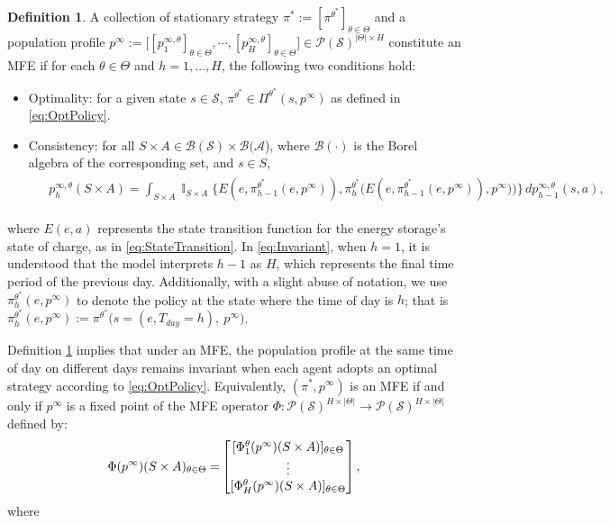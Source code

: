 \documentclass{article}
\theoremstyle{definition}
\newtheorem{definition}{Definition}
\theoremstyle{plain}
\DeclareMathOperator{\I}{\mathbb{I}}
\begin{document}
\begin{definition}
	\label{def:MFE}
	A collection of stationary strategy $\pi^{*} := [\pi^{\theta^{*}}]_{\theta \in \Theta}$ and a population profile $p^{\infty}:=\big[[p^{\infty,\theta}_1]_{\theta \in \Theta},\cdots,[p^{\infty,\theta}_{H}]_{\theta \in \Theta}\big] \in \mathcal{P}(\mathcal{S})^{|\Theta|\times H}$ constitute an MFE if for each $\theta \in \Theta$ and $h = 1, \ldots, H$,  the following two conditions hold: 
	\begin{itemize}
      \setlength{\itemindent}{0.5em}
		\item Optimality: for a given state $s \in \mathcal{S}$, $\pi^{\theta^{*}} \in \Pi^{\theta^*}(s, p^{\infty})$ as defined in \eqref{eq:OptPolicy}.
		
		\item Consistency: for all $S \times A \in \mathcal{B}(\mathcal{S}) \times \mathcal{B}(\mathcal{A}$), where $\mathcal{B}(\cdot)$ is the Borel algebra of the corresponding set, and $s \in S$, 
		\begin{align}
		\begin{split}
		&p^{\infty,\theta}_h(S \times A) = \int_{S \times A} \I_{S \times A}\bigg\{E\left(e,\pi^{\theta^*}_{h-1}\left(e, p^{\infty}\right) \right), \pi_h^{\theta^*}\Big( E\left(e,\pi^{\theta^*}_{h-1}(e,p^{\infty})\right), p^{\infty})\Big)\bigg\} \, dp^{\infty,\theta}_{h-1}(s,a), \label{eq:Invariant}
		\end{split}
		\end{align}
	\end{itemize}
\end{definition} 
\noindent where $E(e, a)$ represents the state transition function for the energy storage's state of charge,  as in \eqref{eq:StateTransition}. 
In \eqref{eq:Invariant}, when \( h = 1 \), it is understood that the model interprets \( h-1 \) as \( H \), which represents the final time period of the previous day. Additionally, with a slight abuse of notation, we use \( \pi^{\theta^*}_{h}(e, p^{\infty}) \) to denote the policy at the state where the time of day is \( h \); that is \(\pi^{\theta^*}_{h}(e, p^{\infty}) := \pi^{\theta^*}\big(s = (e, T_{day} = h),\ p^{\infty}\big) \).

Definition \ref{def:MFE} implies that under an MFE, the population profile at the same time of day on different days remains invariant when each agent adopts an optimal strategy according to \eqref{eq:OptPolicy}. Equivalently, $(\pi^*,p^{\infty})$ is an MFE if and only if $p^{\infty}$ is a fixed point of the MFE operator $\Phi:\mathcal{P}(\mathcal{S})^{H\times|\Theta|} \to \mathcal{P}(\mathcal{S})^{H\times|\Theta|}$ defined by:
\begin{align}
\begin{split}
\label{MFEOPT}
\Phi(p^{\infty})(S \times A)_{\theta \in \Theta}
= &\begin{bmatrix} [\Phi^{\theta}_1(p^{\infty})(S \times A)]_{\theta \in \Theta}\\
	\vdots\\
	[\Phi^{\theta}_{H}(p^{\infty})(S \times A)]_{\theta \in \Theta} \end{bmatrix},\\ 
\end{split}
\end{align}
where 
\end{document}
